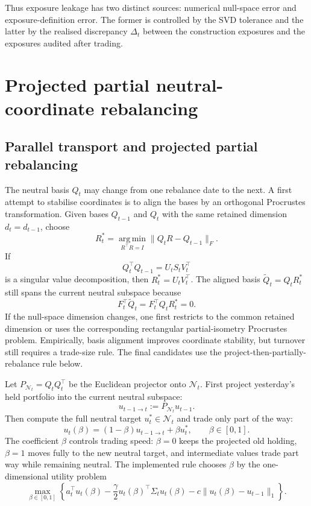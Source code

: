 \documentclass[11pt]{article}
\newcommand{\N}{\mathcal{N}}
\newcommand{\argmin}{\operatorname*{arg\,min}}
\begin{document}
Thus exposure leakage has two distinct sources: numerical null-space error and exposure-definition
error.  The former is controlled by the SVD tolerance and the latter by the realised discrepancy $\Delta_t$
between the construction exposures and the exposures audited after trading.

\section{Projected partial neutral-coordinate rebalancing}

\subsection{Parallel transport and projected partial rebalancing}

The neutral basis $Q_t$ may change from one rebalance date to the next.  A first attempt to stabilise
coordinates is to align the bases by an orthogonal Procrustes transformation.  Given bases $Q_{t-1}$ and
$Q_t$ with the same retained dimension $d_t=d_{t-1}$, choose
\begin{equation}
        R_t^\ast=\argmin_{R^\top R=I}\|Q_tR-Q_{t-1}\|_F.
\end{equation}
If
\[
        Q_t^\top Q_{t-1}=U_tS_tV_t^\top
\]
is a singular value decomposition, then $R_t^\ast=U_tV_t^\top$.  The aligned basis
$\widetilde Q_t=Q_tR_t^\ast$ still spans the current neutral subspace because
\[
        F_t^\top\widetilde Q_t=F_t^\top Q_tR_t^\ast=0.
\]
If the null-space dimension changes, one first restricts to the common retained dimension or uses the
corresponding rectangular partial-isometry Procrustes problem.  Empirically, basis alignment improves
coordinate stability, but turnover still requires a trade-size rule.  The final candidates use the
project-then-partially-rebalance rule below.

Let $P_{\N_t}=Q_tQ_t^\top$ be the Euclidean projector onto $\N_t$.  First project yesterday's held
portfolio into the current neutral subspace:
\begin{equation}
        u_{t-1\to t}:=P_{\N_t}u_{t-1}.
\end{equation}
Then compute the full neutral target $u_t^\ast\in\N_t$ and trade only part of the way:
\begin{equation}
        u_t(\beta)=(1-\beta)u_{t-1\to t}+\beta u_t^\ast,\qquad \beta\in[0,1].
\end{equation}
The coefficient $\beta$ controls trading speed: $\beta=0$ keeps the projected old holding, $\beta=1$
moves fully to the new neutral target, and intermediate values trade part way while remaining neutral.
The implemented rule chooses $\beta$ by the one-dimensional utility problem
\begin{equation}
        \max_{\beta\in[0,1]}
        \left\{
        a_t^\top u_t(\beta)
        -\frac{\gamma}{2}u_t(\beta)^\top\Sigma_tu_t(\beta)
        -c\|u_t(\beta)-u_{t-1}\|_1
        \right\}.
\label{eq:beta-choice}
\end{equation}
\end{document}
